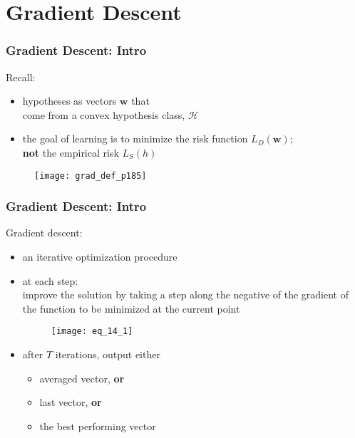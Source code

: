 \section{Gradient Descent}

\begin{frame}
\frametitle{Gradient Descent: Intro}

Recall:\\
\begin{itemize}
\item hypotheses as vectors $\mathbf{w}$ that \\
     come from a convex hypothesis class, $\mathcal{H}$
\item the goal of learning is to minimize the risk function $L_D(\mathbf{w})$;\\
      \textbf{not} the empirical risk $L_S (h)$
\end{itemize}

\begin{figure}
    \centering
    \texttt{[image: grad\_def\_p185]}
\end{figure}


\end{frame}

\begin{frame}
\frametitle{Gradient Descent: Intro}
Gradient descent:
\begin{itemize}
\item an iterative optimization procedure
\item at each step: \\
    improve the solution by
    taking a step along the negative of the gradient of the function to be minimized at the current point

    \begin{figure}
    \centering
    \texttt{[image: eq\_14\_1]}
    \end{figure}
\item after $T$ iterations, output either
    \begin{itemize}
        \item averaged vector, \textbf{or}
        \item last vector, \textbf{or}
        \item the best performing vector
    \end{itemize}
\end{itemize}

\end{frame}

